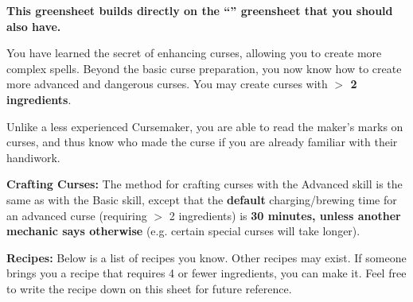 \documentclass[green]{GL2020}
\begin{document}
\name{\gCursemakingAdvanced{}}

\textbf{This greensheet builds directly on the ``\gCursemakingBasic{}'' greensheet that you should also have.}

You have learned the secret of enhancing curses, allowing you to create more complex spells. Beyond the basic curse preparation, you now know how to create more advanced and dangerous curses. You may create curses with \textbf{ $>$ 2 ingredients}.

Unlike a less experienced Cursemaker, you are able to read the maker’s marks on curses, and thus know who made the curse if you are already familiar with their handiwork.

\textbf{Crafting Curses:}
The method for crafting curses with the Advanced skill is the same as with the Basic skill, except that the \textbf{default} charging/brewing time for an advanced curse (requiring $>$ 2 ingredients) is \textbf{30 minutes, unless another mechanic says otherwise} (e.g. certain special curses will take longer).

\textbf{Recipes:}
Below is a list of recipes you know. Other recipes may exist. If someone brings you a recipe that requires 4 or fewer ingredients, you can make it. Feel free to write the recipe down on this sheet for future reference.
\end{document}
